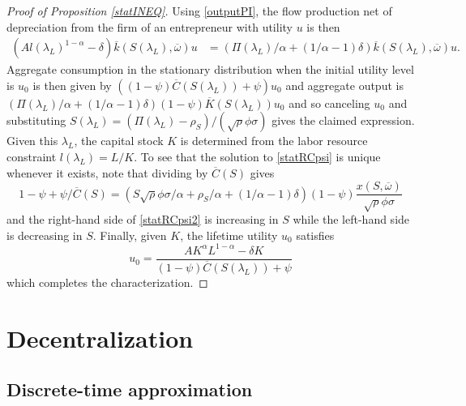 \documentclass[11pt]{article}
\theoremstyle{plain}
\theoremstyle{definition} %
\begin{document}
\begin{proof}[Proof of Proposition \ref{statINEQ}] 
Using \eqref{outputPI}, the flow production net of depreciation from the firm of an entrepreneur with utility $u$ is then 
\begin{align*} %
(Al(\lambda_L)^{1-\alpha} - \delta)\overline{k}(S(\lambda_L), \overline{\omega})u & = (\Pi(\lambda_L)/\alpha + (1/\alpha - 1)\delta)\overline{k}(S(\lambda_L), \overline{\omega})u.
\end{align*}
Aggregate consumption in the stationary distribution when the initial utility level is $u_0$ is then given by $((1-\psi)\overline{C}(S(\lambda_L)) + \psi)u_0$ and aggregate output is 
$(\Pi(\lambda_L)/\alpha + (1/\alpha - 1)\delta)(1-\psi)\overline{K}(S(\lambda_L))u_0$ and so canceling $u_0$ and substituting $S(\lambda_L) = (\Pi(\lambda_L) - \rho_S)/(\sqrt{\rho} \phi \sigma)$ gives the claimed expression. Given this $\lambda_L$, the capital stock $K$ is determined from the labor resource constraint $l(\lambda_L) = L/K$. To see that the solution to \eqref{statRCpsi} is unique whenever it exists, note that dividing by $\overline{C}(S)$ gives
\begin{equation}
1-\psi + \psi/\overline{C}(S) = {\left(S\sqrt{\rho}\phi \sigma/\alpha + \rho_S/\alpha + (1/\alpha-1)\delta \right)}(1-\psi)\frac{x(S, \overline{\omega})}{\sqrt{\rho}\phi \sigma} 
\label{statRCpsi2}
\end{equation}
and the right-hand side of \eqref{statRCpsi2} is increasing in $S$ while the left-hand side is decreasing in $S$. Finally, given $K$, the lifetime utility $u_0$ satisfies 
\begin{equation}
u_0 = \frac{AK^{\alpha}L^{1-\alpha} - \delta K}{(1-\psi)\overline{C}(S(\lambda_L)) + \psi}
\label{u0}
\end{equation}
which completes the characterization.
\end{proof} 


\section{Decentralization} \label{APPdecent} \subsection{Discrete-time approximation}
\end{document}
